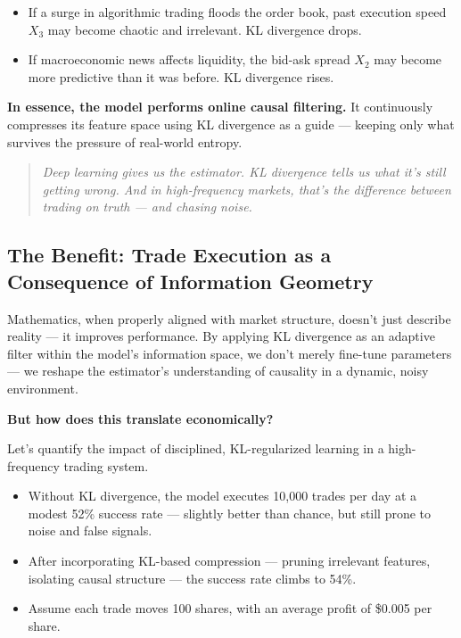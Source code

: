 \begin{itemize}
    \item If a surge in algorithmic trading floods the order book, past execution speed \( X_3 \) may become chaotic and irrelevant. KL divergence drops.
    \item If macroeconomic news affects liquidity, the bid-ask spread \( X_2 \) may become more predictive than it was before. KL divergence rises.
\end{itemize}

\textbf{In essence, the model performs online causal filtering.} It continuously compresses its feature space using KL divergence as a guide — keeping only what survives the pressure of real-world entropy.

\begin{quote}
\textit{Deep learning gives us the estimator. KL divergence tells us what it's still getting wrong. And in high-frequency markets, that’s the difference between trading on truth — and chasing noise.}
\end{quote}





\subsection{The Benefit: Trade Execution as a Consequence of Information Geometry}

Mathematics, when properly aligned with market structure, doesn’t just describe reality — it improves performance. By applying KL divergence as an adaptive filter within the model’s information space, we don’t merely fine-tune parameters — we reshape the estimator’s understanding of causality in a dynamic, noisy environment.

\textbf{But how does this translate economically?}

Let’s quantify the impact of disciplined, KL-regularized learning in a high-frequency trading system.

\begin{itemize}
    \item Without KL divergence, the model executes 10,000 trades per day at a modest 52\% success rate — slightly better than chance, but still prone to noise and false signals.
    \item After incorporating KL-based compression — pruning irrelevant features, isolating causal structure — the success rate climbs to 54\%.
    \item Assume each trade moves 100 shares, with an average profit of \$0.005 per share.
\end{itemize}

